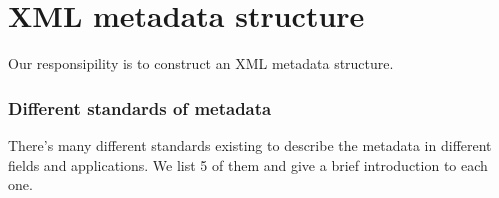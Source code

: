 \section*{XML metadata structure}
\label{sec:abs}


Our responsipility is to construct an XML metadata structure.



\subsubsection{Different standards of metadata}
\label{sec:mets}
There's many different standards existing to describe the metadata in different fields and applications. We list 5 of them and give a brief introduction to each one.

